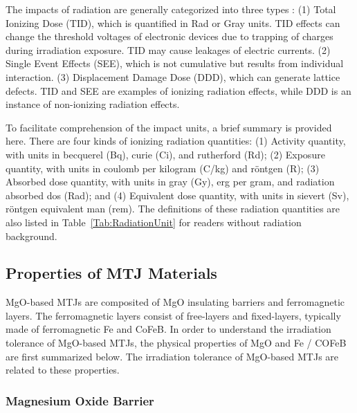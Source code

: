 \documentclass[molecules,review,submit,pdftex,moreauthors]{Definitions/mdpi}
\begin{document}
The impacts of radiation are generally categorized into three types : (1) Total Ionizing Dose (TID), which is quantified in Rad or Gray units.  TID effects can change the threshold voltages of electronic devices due to trapping of charges during irradiation exposure.  TID may cause leakages of electric currents.  (2) Single Event Effects (SEE), which is not cumulative but results from individual interaction.   (3) Displacement Damage Dose (DDD), which can generate lattice defects.    TID and SEE are examples of ionizing radiation effects, while DDD is an instance of non-ionizing radiation effects. 


To facilitate comprehension of the impact units, a brief summary is provided here. There are four kinds of ionizing radiation quantities: (1) Activity quantity, with units in becquerel (Bq), curie (Ci), and rutherford (Rd); (2) Exposure quantity,  with units in coulomb per kilogram (C/kg) and r\"{o}ntgen (R); (3) Absorbed dose quantity, with units in gray (Gy), erg per gram, and radiation absorbed dos (Rad);  and (4) Equivalent dose quantity, with units in sievert (Sv), r\"{o}ntgen equivalent man (rem).  The definitions of these radiation quantities are also listed in Table~\ref{Tab:RadiationUnit} for readers without radiation background.


\vspace{12pt}
\subsection{Properties of MTJ Materials}


MgO-based MTJs are composited of MgO insulating barriers and ferromagnetic layers.  The ferromagnetic layers consist of free-layers and fixed-layers, typically made of ferromagnetic Fe and CoFeB.  In order to understand the irradiation tolerance of MgO-based MTJs, the physical properties of MgO and Fe / COFeB are first summarized below.  The irradiation tolerance of MgO-based MTJs are related to these properties.


\subsubsection{Magnesium Oxide Barrier}
\end{document}
